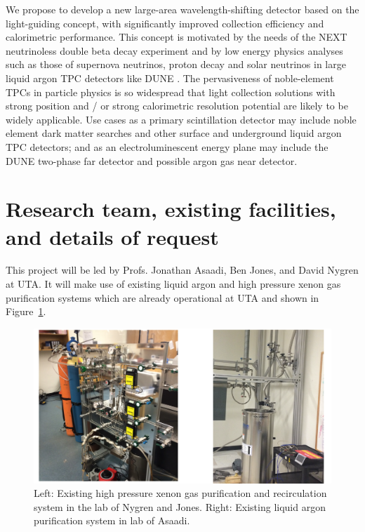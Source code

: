 We propose to develop a new large-area wavelength-shifting detector based on the light-guiding concept, with significantly improved collection efficiency and calorimetric performance.  This concept is motivated by the needs of the NEXT neutrinoless double beta decay experiment \cite{Mart} and by low energy physics analyses such as those of supernova neutrinos, proton decay and solar neutrinos in large liquid argon TPC detectors like DUNE \cite{Ankowski:2016lab,Kudryavtsev:2016ybl}. The pervasiveness of noble-element TPCs in particle physics is so widespread that light collection solutions with strong position and / or strong calorimetric resolution potential are likely to be widely applicable.  Use cases as a primary scintillation detector may include noble element dark matter searches and other surface and underground liquid argon TPC detectors; and as an electroluminescent energy plane may include the DUNE two-phase far detector and possible argon gas near detector.

\section{Research team, existing facilities, and details of request}

This project will be led by Profs. Jonathan Asaadi, Ben Jones, and David Nygren at UTA.  It will make use of existing liquid argon and high pressure xenon gas purification systems which are already operational at UTA and shown in Figure~\ref{fig:ExistingGasSystems}.  


\begin{figure}[t]
\begin{centering}
\includegraphics[width=0.90\columnwidth]{./images/PhotosOfLabs.pdf}
\par\end{centering}

\caption{Left: Existing high pressure xenon gas purification and recirculation system in the lab of Nygren and Jones.  Right: Existing liquid argon purification system in lab of Asaadi. \label{fig:ExistingGasSystems}}
\end{figure}

